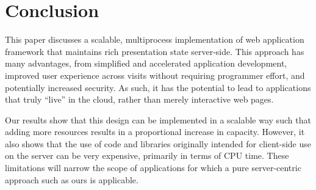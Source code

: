 \section{Conclusion}
\label{sec:conclu}

This paper discusses a scalable, multiprocess implementation of web application framework
that maintains rich presentation state server-side.  This approach has many 
advantages, from simplified and accelerated application development, improved user 
experience across visits without requiring programmer effort, and potentially 
increased security.   As such, it has the potential to lead to applications
that truly ``live'' in the cloud, rather than merely interactive web pages.

Our results show that this design can be implemented in a scalable way such that
adding more resources results in a proportional increase in capacity.  However,
it also shows that the use of code and libraries originally intended for client-side
use on the server can be very expensive, primarily in terms of CPU time.
These limitations will narrow the scope of applications for which a pure
server-centric approach such as ours is applicable.
